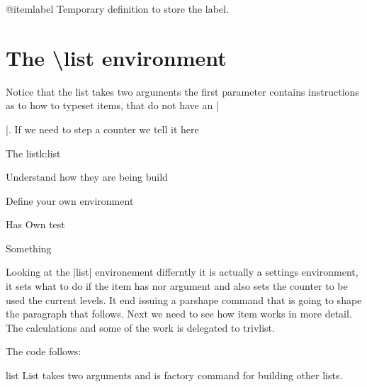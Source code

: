 \begin{docCommand} {@itemlabel} { }
  Temporary definition to store the label.
\end{docCommand}

\section{The \textbackslash list environment}

Notice that the list takes two arguments the first parameter contains instructions as to how
to typeset items, that do not have an |\item[]|. If we need to step a counter we tell it here


\begin{texexample}{The list}{k:list}
\begin{list}{\bfseries\upshape Step :}
{%
\setlength{\labelwidth}{2cm}\setlength{\leftmargin}{2.6cm}
\setlength{\labelsep}{0.5cm}\setlength{\rightmargin}{1cm}
\setlength{\parsep}{0.5ex plus0.2ex minus0.1ex}
\setlength{\itemsep}{0ex plus0.2ex minus0pt}\relax \slshape %
}
\item Understand how they are being build
\item Define your own environment
\item[Has Own] test
\end{list}


\newenvironment{myplain}
{ 
   }
 {\endlist}


\begin{myplain}
\item \lorem

\item[Something]  \lorem
\end{myplain}
\end{texexample}

Looking at the |list| environement differntly it is actually a settings environment, it sets what to do if the item has nor argument and also sets the counter to be used the current levels. It end issuing a parshape command that is going to
shape the paragraph that follows. Next we need to see how item works in more detail. The calculations and some of the work is
delegated to trivlist.

The code follows:


\begin{docCommand} {list} {  }
 List takes two arguments and is factory command for building
other lists.
\end{docCommand}


